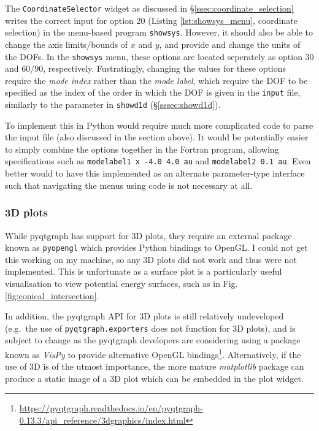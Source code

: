 \documentclass[12pt]{article}
\begin{document}
The \texttt{CoordinateSelector} widget as discussed in \S\ref{ssec:coordinate_selection} writes the correct input for option 20 (Listing \ref{lst:showsys_menu}, coordinate selection) in the menu-based program \texttt{showsys}. However, it should also be able to change the axis limits/bounds of \(x\) and \(y\), and provide and change the units of the DOFs. In the \texttt{showsys} menu, these options are located seperately as option 30 and 60/90, respectively. Fustratingly, changing the values for these options require the \textit{mode index} rather than the \textit{mode label}, which require the DOF to be specified as the index of the order in which the DOF is given in the \texttt{input} file, similarly to the parameter in \texttt{showd1d} (\S\ref{sssec:showd1d}).

To implement this in Python would require much more complicated code to parse the input file (also discussed in the section above). It would be potentially easier to simply combine the options together in the Fortran program, allowing specifications such as \texttt{modelabel1 x -4.0 4.0 au} and \texttt{modelabel2 0.1 au}. Even better would to have this implemented as an alternate parameter-type interface such that navigating the menus using code is not necessary at all.

\subsubsection{3D plots}

While pyqtgraph has support for 3D plots, they require an external package known as \texttt{pyopengl} which provides Python bindings to OpenGL. I could not get this working on my machine, so any 3D plots did not work and thus were not implemented. This is unfortunate as a surface plot is a particularly useful visualisation to view potential energy surfaces, such as in Fig. \ref{fig:conical_intersection}.

In addition, the pyqtgraph API for 3D plots is still relatively undeveloped (e.g.~the use of \texttt{pyqtgraph.exporters} does not function for 3D plots), and is subject to change as the pyqtgraph developers are considering using a package known as \textit{VisPy} to provide alternative OpenGL bindings\footnote{\url{https://pyqtgraph.readthedocs.io/en/pyqtgraph-0.13.3/api_reference/3dgraphics/index.html}}. Alternatively, if the use of 3D is of the utmost importance, the more mature \textit{matplotlib} package can produce a static image of a 3D plot which can be embedded in the plot widget.
\end{document}
